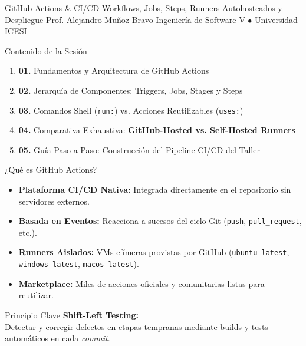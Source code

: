 \documentclass[aspectratio=169]{beamer}
\begin{document}
\titleSlideDarkMode
  {GitHub Actions \& CI/CD}
  {Workflows, Jobs, Steps, Runners Autohosteados y Despliegue}
  {Prof. Alejandro Muñoz Bravo}
  {Ingeniería de Software V $\bullet$ Universidad ICESI}

\begin{frame}{Contenido de la Sesión}
  \vspace{0.2cm}
  \begin{enumerate}[itemsep=10pt]
    \item \textbf{\color{cbBlue}01.} Fundamentos y Arquitectura de GitHub Actions
    \item \textbf{\color{cbBlue}02.} Jerarquía de Componentes: Triggers, Jobs, Stages y Steps
    \item \textbf{\color{cbBlue}03.} Comandos Shell (\texttt{run:}) vs. Acciones Reutilizables (\texttt{uses:})
    \item \textbf{\color{cbBlue}04.} Comparativa Exhaustiva: \textbf{GitHub-Hosted vs. Self-Hosted Runners}
    \item \textbf{\color{cbBlue}05.} Guía Paso a Paso: Construcción del Pipeline CI/CD del Taller
  \end{enumerate}
\end{frame}


\contentSlideBulletCard
  {¿Qué es GitHub Actions?}
  {
    \begin{itemize}
      \item \textbf{Plataforma CI/CD Nativa:} Integrada directamente en el repositorio sin servidores externos.
      \item \textbf{Basada en Eventos:} Reacciona a sucesos del ciclo Git (\texttt{push}, \texttt{pull\_request}, etc.).
      \item \textbf{Runners Aislados:} VMs efímeras provistas por GitHub (\texttt{ubuntu-latest}, \texttt{windows-latest}, \texttt{macos-latest}).
      \item \textbf{Marketplace:} Miles de acciones oficiales y comunitarias listas para reutilizar.
    \end{itemize}
  }
  {Principio Clave}
  {
    \textbf{Shift-Left Testing:}\\[0.15cm]
    Detectar y corregir defectos en etapas tempranas mediante builds y tests automáticos en cada \textit{commit}.
  }
\end{document}
